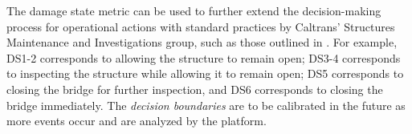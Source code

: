 The damage state metric can be used to further extend the decision-making process for operational actions with standard practices by Caltrans' Structures Maintenance and Investigations group, such as those outlined in \cite{caltrans2017first}. 
For example, DS1-2 corresponds to allowing the structure to remain open; DS3-4 corresponds to inspecting the structure while allowing it to remain open; DS5 corresponds to closing the bridge for further inspection, and DS6 corresponds to closing the bridge immediately. 
The {\em{decision boundaries}} are to be calibrated in the future as more events occur and are analyzed by the \gls{platform}.

\endgroup